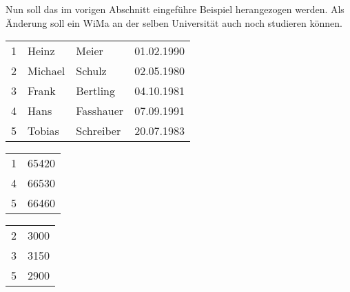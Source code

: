           Nun soll das im vorigen Abschnitt eingeführe Beispiel herangezogen werden. Als Änderung soll ein WiMa an der selben Universität auch noch studieren können.
\vfil
          \begin{supertabular}[h]{llll}
            1 & Heinz & Meier & 01.02.1990 \\
            2 & Michael & Schulz & 02.05.1980 \\
            3 & Frank & Bertling & 04.10.1981 \\
            4 & Hans & Fasshauer & 07.09.1991 \\
            5 & Tobias & Schreiber & 20.07.1983 \\
          \end{supertabular}
\vfil
          \begin{supertabular}[h]{lp{5cm}}
            1 & 65420\\
            4 & 66530\\
            5 & 66460\\
          \end{supertabular}

          \begin{supertabular}[h]{lp{5cm}}
            2 & 3000\\
            3 & 3150\\
            5 & 2900\\
          \end{supertabular}

